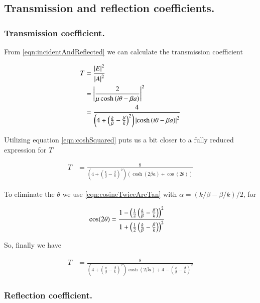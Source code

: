\documentclass{article}
\begin{document}
\subsection{ Transmission and reflection coefficients. }

\subsubsection{ Transmission coefficient. }

From \ref{eqn:incidentAndReflected} we can calculate the transmission
coefficient

\begin{align*}
T &= \frac{\left\lvert{E}\right\rvert^2}{\left\lvert{A}\right\rvert^2} \\
&= \left\lvert{\frac{2  } { \mu \cosh\left( i\theta -\beta a \right) }}\right\rvert^2 \\
&= \frac{4} { 
\left(4 + \left( \frac{k}{\beta} -\frac{\beta}{k} \right)^2 \right)
\left\lvert{\cosh\left( i\theta -\beta a \right)}\right\rvert^2 }
\end{align*}

Utilizing equation \ref{eqn:coshSquared}
puts us a bit closer to a fully reduced expression for $T$

\begin{align*}
T 
&= \frac{8} { 
\left(4 + \left( \frac{k}{\beta} -\frac{\beta}{k} \right)^2 \right)
\left( \cosh(2\beta a) + \cos(2\theta) \right)
}
\end{align*}

To eliminate the $\theta$ we use \ref{eqn:cosineTwiceArcTan}
with $\alpha = ({k}/{\beta} - {\beta}/{k} )/2$, for

\begin{align*}
\cos(2\theta) 
&= 
\frac{ 1 - \left(\frac{1}{2} \left(\frac{k}{\beta} - \frac{\beta}{k} \right)\right)^2 }
{1 + \left(\frac{1}{2} \left(\frac{k}{\beta} - \frac{\beta}{k} \right)\right)^2}
\end{align*}

So, finally we have

\begin{align}\label{eqn:Tcoeff1}
T 
&= \frac{8} { 
\left(4 + \left( \frac{k}{\beta} -\frac{\beta}{k} \right)^2 \right)
\cosh(2\beta a)
+ 
4 - \left(\frac{k}{\beta} - \frac{\beta}{k} \right)^2 
}
\end{align}

\subsubsection{ Reflection coefficient. }
\end{document}
